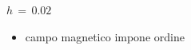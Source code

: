 \begin{frame}
\begin{columns}
\begin{column}{0.5\textwidth}
\begin{block}{$h\,=\,0.02$}
                \vspace{0.5cm}
                \begin{itemize}[itemsep=0.5em, label=$\diamond$]
                    \item campo magnetico impone ordine
                \end{itemize}
            
            \end{block}
        \end{column}
    \end{columns}

\end{frame}



